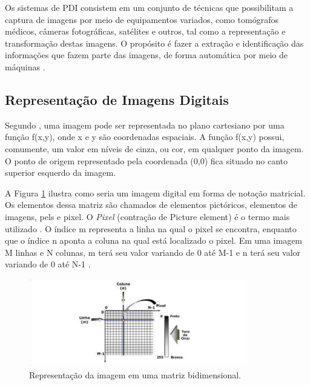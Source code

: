 Os sistemas de PDI consistem em um conjunto de técnicas que possibilitam a captura de imagens por meio de equipamentos variados, como tomógrafos médicos, câmeras fotográficas, satélites e outros, tal como a representação e transformação destas imagens. O propósito é fazer a extração e identificação das informações que fazem parte das imagens, de forma automática por meio de máquinas \cite{PEDRINI2008}.



\subsection{Representação de Imagens Digitais}

Segundo , uma imagem pode ser representada no plano cartesiano por uma função f(x,y), onde x e y são coordenadas espaciais. A função f(x,y) possui, comumente, um valor em níveis de cinza, ou cor, em qualquer ponto da imagem. O ponto de origem representado pela coordenada (0,0) fica situado no canto superior esquerdo da imagem.




A Figura \ref{img1} ilustra como seria um imagem digital em forma de notação matricial. Os elementos dessa matriz são chamados de elementos pictóricos, elementos de imagens, pels e pixel. O \textit{Pixel} (contração de Picture element) é o termo mais utilizado \cite{GONZALEZ2006}. O índice m representa a linha na qual o pixel se encontra, enquanto que o índice n aponta a coluna na qual está localizado o pixel. Em uma imagem M linhas e N colunas, m terá seu valor variando de 0 até M-1 e n terá seu valor variando de 0 até N-1 \cite{Almeida2018}. 

 \begin{figure}[h!]
	\centering
	\includegraphics[width=0.85\textwidth]{Imagens/imagem1} 
	\caption[Representação da imagem em uma matriz bidimensional.]{Representação da imagem em uma matriz bidimensional.}
	\label{img1}
\end{figure}


